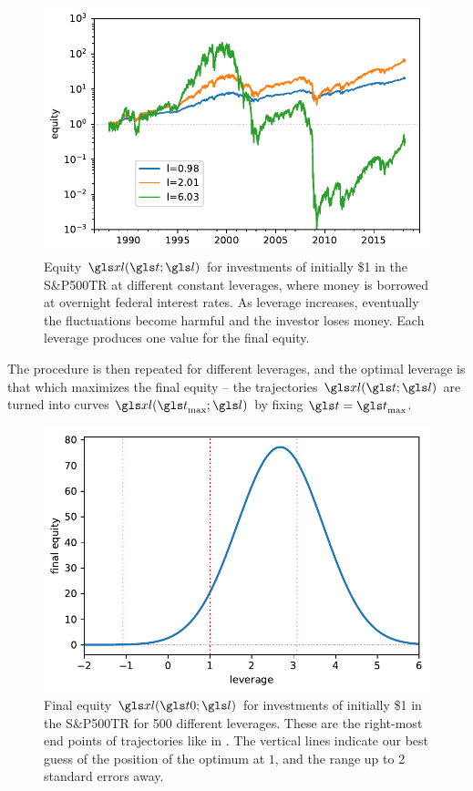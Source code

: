 \begin{figure}
\centering
\includegraphics[width=\textwidth]{./chapter_4/figs/STR-FED-1_equity.pdf}
\caption{Equity $\xl(\t; \l)$ for investments of initially \$1 in the S\&P500TR at different constant leverages, where money is borrowed at overnight federal interest rates. As leverage increases, eventually the fluctuations become harmful and the investor loses money. Each leverage produces one value for the final equity.
}
\end{figure}

The procedure is then repeated for different leverages, and the optimal leverage is that which maximizes the final equity -- the trajectories $\xl(\t;\l)$ are turned into curves $\xl(\t_{\text{max}}; \l)$ by fixing $\t=\t_{\text{max}}$. 
\begin{figure}
\centering
\includegraphics[width=\textwidth]{./chapter_4/figs/STR-FED_final_equity.pdf}
\caption{Final equity $\xl(\tn; \l)$ for investments of initially \$1 in the S\&P500TR for 500 different leverages. These are the right-most end points of trajectories like in . The vertical lines indicate our best guess of the position of the optimum at $1$, and the range up to 2 standard errors away.
}
\end{figure}

